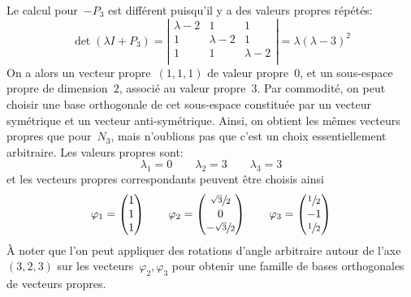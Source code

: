 \documentclass[a4paper,11pt]{article}
\begin{document}
Le calcul pour~$-P_3$ est différent puisqu'il y a des valeurs propres répétés:
\[
	\det\left(\lambda I + P_3\right)
	=
	\left|
	\begin{matrix}
		\lambda-2 & 1 & 1 \\
		1 & \lambda-2 & 1 \\
		1 & 1 & \lambda-2 \\
	\end{matrix}
	\right|
	=\lambda(\lambda-3)^2
\]
On a alors un vecteur propre~$(1,1,1)$ de valeur propre~$0$, et un sous-espace
propre de dimension~$2$, associé au valeur propre~$3$.  Par commodité, on peut
choisir une base orthogonale de cet sous-espace constituée par un vecteur
symétrique et un vecteur anti-symétrique.  Ainsi, on obtient les mêmes vecteurs
propres que pour~$N_3$, mais n'oublions pas que c'est un choix essentiellement
arbitraire.  Les valeurs propres sont:
\[
	\lambda_1 = 0
	\qquad
	\lambda_2 = 3
	\qquad
	\lambda_3 = 3
\]
et les vecteurs propres correspondants peuvent être choisis ainsi
\[
	\varphi_1=\begin{pmatrix}
		1\\
		1\\
		1
	\end{pmatrix}
	\qquad
	\varphi_2=\begin{pmatrix}
		\sfrac{\sqrt3}2\\
		0\\
		-\sfrac{\sqrt3}2
	\end{pmatrix}
	\qquad
	\varphi_3=\begin{pmatrix}
		\sfrac12\\
		-1\\
		\sfrac12\\
	\end{pmatrix}
\]
À noter que l'on peut appliquer des rotations d'angle arbitraire autour de
l'axe~$(3,2,3)$ sur les vecteurs~$\varphi_2,\varphi_3$ pour obtenir une famille
de bases orthogonales de vecteurs propres.
\end{document}
